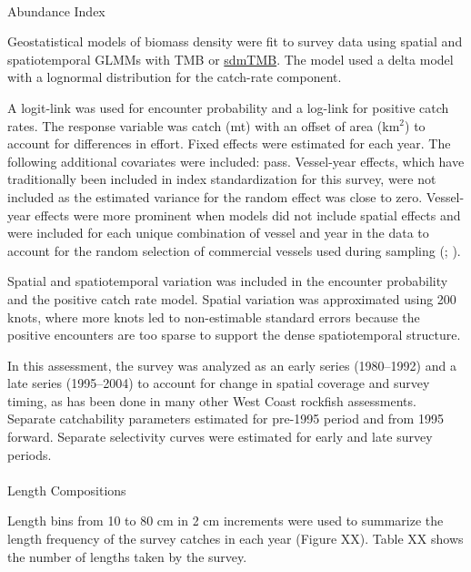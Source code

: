 \documentclass[
]{scrartcl}
\makeatletter
\let\oldparagraph\paragraph
\renewcommand{\paragraph}{
    \@ifstar
      \xxxParagraphStar
      \xxxParagraphNoStar
  }
\newcommand{\xxxParagraphStar}[1]{\oldparagraph*{#1}\mbox{}}
\newcommand{\xxxParagraphNoStar}[1]{\oldparagraph{#1}\mbox{}}
\makeatother
\begin{document}
\paragraph{Abundance Index}\label{abundance-index}

Geostatistical models of biomass density were fit to survey data using
spatial and spatiotemporal GLMMs with TMB or
\href{https://pbs-assess.github.io/sdmTMB/}{sdmTMB}. The model used a
delta model with a lognormal distribution for the catch-rate component.

A logit-link was used for encounter probability and a log-link for
positive catch rates. The response variable was catch (mt) with an
offset of area (km\(^2\)) to account for differences in effort. Fixed
effects were estimated for each year. The following additional
covariates were included: pass. Vessel-year effects, which have
traditionally been included in index standardization for this survey,
were not included as the estimated variance for the random effect was
close to zero. Vessel-year effects were more prominent when models did
not include spatial effects and were included for each unique
combination of vessel and year in the data to account for the random
selection of commercial vessels used during sampling
(;
).

Spatial and spatiotemporal variation was included in the encounter
probability and the positive catch rate model. Spatial variation was
approximated using 200 knots, where more knots led to non-estimable
standard errors because the positive encounters are too sparse to
support the dense spatiotemporal structure.

In this assessment, the survey was analyzed as an early series
(1980--1992) and a late series (1995--2004) to account for change in
spatial coverage and survey timing, as has been done in many other West
Coast rockfish assessments. Separate catchability parameters estimated
for pre-1995 period and from 1995 forward. Separate selectivity curves
were estimated for early and late survey periods.

\paragraph{Length Compositions}\label{length-compositions}

Length bins from 10 to 80 cm in 2 cm increments were used to summarize
the length frequency of the survey catches in each year (Figure XX).
Table XX shows the number of lengths taken by the survey.
\end{document}
